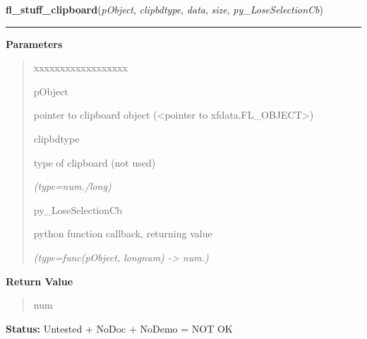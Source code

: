 \hspace{.8\funcindent}\begin{boxedminipage}{\funcwidth}

    \raggedright \textbf{fl\_stuff\_clipboard}(\textit{pObject}, \textit{clipbdtype}, \textit{data}, \textit{size}, \textit{py\_LoseSelectionCb})

    \vspace{-1.5ex}

    \rule{\textwidth}{0.5\fboxrule}
\setlength{\parskip}{2ex}
\setlength{\parskip}{1ex}
      \textbf{Parameters}
      \vspace{-1ex}

      \begin{quote}
        \begin{Ventry}{xxxxxxxxxxxxxxxxxx}

          \item[pObject]

          pointer to clipboard object ({\textless}pointer to 
          xfdata.FL\_OBJECT{\textgreater})

          \item[clipbdtype]

          type of clipboard (not used)

            {\it (type=num./long)}

          \item[py\_LoseSelectionCb]

          python function callback, returning value

            {\it (type=func(pObject, longnum) -{\textgreater} num.)}

        \end{Ventry}

      \end{quote}

      \textbf{Return Value}
    \vspace{-1ex}

      \begin{quote}
      num

      \end{quote}

\textbf{Status:} Untested + NoDoc + NoDemo = NOT OK



    \end{boxedminipage}

    \label{xformslib:library:fl_request_clipboard}

